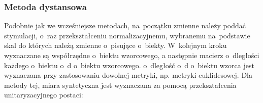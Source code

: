 \documentclass[12pt,a4paper]{report}
\begin{document}
%
%
%
%
%
%
%
%
%

\subsubsection{Metoda dystansowa}


Podobnie jak we wcześniejsze metodach, na~początku zmienne należy poddać stymulacji, o~raz przekształceniu normalizacyjnemu, wybranemu na~podstawie skal do których należą zmienne o~pisujące o~biekty. W~kolejnym kroku wyznaczane są współrzędne o~biektu wzorcowego, a następnie macierz o~dległości każdego o~biektu o~d o~biektu wzorcowego. o~dległość o~d o~biektu wzorca jest wyznaczana przy zastosowaniu dowolnej metryki, np. metryki euklidesowej. %
Dla metody tej, miara syntetyczna jest wyznaczana za pomocą przekształcenia unitaryzacyjnego postaci: 
\end{document}
